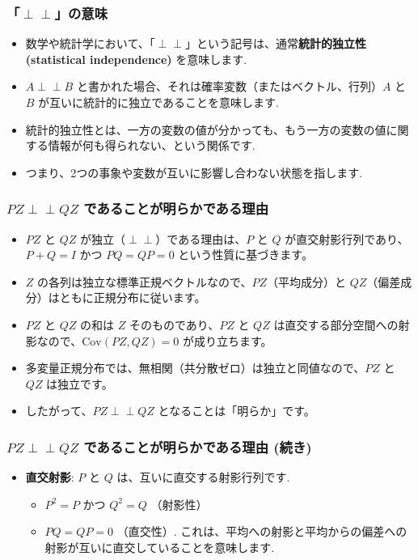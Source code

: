 \documentclass[aspectratio=169]{beamer}
\begin{document}
\begin{frame}
\frametitle{「$\perp\perp$」の意味}
\begin{itemize}
    \item 数学や統計学において、「$\perp\perp$」という記号は、通常\textbf{統計的独立性 (statistical independence)} を意味します.
    \item $A\perp\perp B$ と書かれた場合、それは確率変数（またはベクトル、行列）$A$ と $B$ が互いに統計的に独立であることを意味します.
    \item 統計的独立性とは、一方の変数の値が分かっても、もう一方の変数の値に関する情報が何も得られない、という関係です.
    \item つまり、2つの事象や変数が互いに影響し合わない状態を指します.
\end{itemize}
\end{frame}

\begin{frame}
\frametitle{$PZ\perp\perp QZ$ であることが明らかである理由}
\begin{itemize}
    \item $PZ$ と $QZ$ が独立（$\perp\perp$）である理由は、$P$ と $Q$ が直交射影行列であり、$P+Q=I$ かつ $PQ=QP=0$ という性質に基づきます。
    \item $Z$ の各列は独立な標準正規ベクトルなので、$PZ$（平均成分）と $QZ$（偏差成分）はともに正規分布に従います。
    \item $PZ$ と $QZ$ の和は $Z$ そのものであり、$PZ$ と $QZ$ は直交する部分空間への射影なので、$\mathrm{Cov}(PZ, QZ) = 0$ が成り立ちます。
    \item 多変量正規分布では、無相関（共分散ゼロ）は独立と同値なので、$PZ$ と $QZ$ は独立です。
    \item したがって、$PZ \perp\perp QZ$ となることは「明らか」です。
\end{itemize}
\end{frame}

\begin{frame}
\frametitle{$PZ\perp\perp QZ$ であることが明らかである理由 (続き)}
\begin{itemize}
    \item \textbf{直交射影}: $P$ と $Q$ は、互いに直交する射影行列です.
    \begin{itemize}
        \item $P^2=P$ かつ $Q^2=Q$ （射影性）
        \item $PQ=QP=0$ （直交性）. これは、平均への射影と平均からの偏差への射影が互いに直交していることを意味します.
    \end{itemize}
\end{itemize}
\end{frame}
\end{document}
